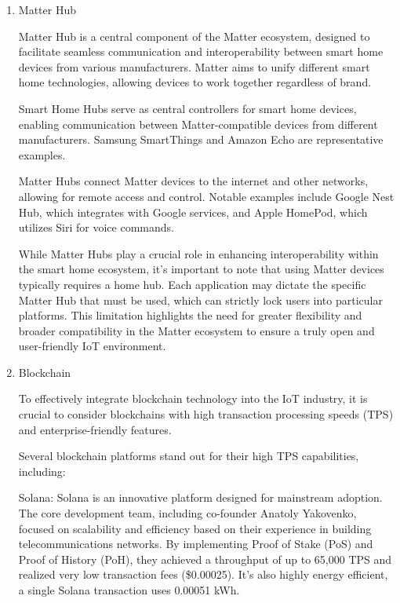 \documentclass[conference]{IEEEtran}
\begin{document}
\begin{enumerate}[itemsep=2ex, parsep=1ex]
	\item Matter Hub
	      	      
	      Matter Hub is a central component of the Matter ecosystem, designed to facilitate
	      seamless communication and interoperability between smart home devices from
	      various manufacturers. Matter aims to unify different smart home
	      technologies, allowing devices to work together regardless of brand.
	      	      
	      Smart Home Hubs serve as central controllers for smart home devices,
	      enabling communication between Matter-compatible devices from different
	      manufacturers. Samsung SmartThings and Amazon Echo are representative examples.
	      	      
	      Matter Hubs connect Matter devices to the internet and other networks,
	      allowing for remote access and control. Notable examples include Google Nest
	      Hub, which integrates with Google services, and Apple HomePod, which
	      utilizes Siri for voice commands.
	      	      
	      While Matter Hubs play a crucial role in enhancing interoperability within
	      the smart home ecosystem, it's important to note that using Matter devices
	      typically requires a home hub. Each application may dictate the specific
	      Matter Hub that must be used, which can strictly lock users into particular
	      platforms. This limitation highlights the need for greater flexibility and
	      broader compatibility in the Matter ecosystem to ensure a truly open and
	      user-friendly IoT environment.
	      	      
	\item Blockchain
	      	      
	      To effectively integrate blockchain technology into the IoT industry, it is
	      crucial to consider blockchains with high transaction processing speeds (TPS)
	      and enterprise-friendly features.
	      	      
	      Several blockchain platforms stand out for their high TPS capabilities,
	      including:
	      	      
	      Solana: Solana is an innovative platform designed for mainstream adoption.
	      The core development team, including co-founder Anatoly Yakovenko, focused
	      on scalability and efficiency based on their experience in building
	      telecommunications networks. By implementing Proof of Stake (PoS) and Proof
	      of History (PoH), they achieved a throughput of up to 65,000 TPS and
	      realized very low transaction fees (\$0.00025). It's also highly energy
	      efficient, a single Solana transaction uses 0.00051 kWh.
	      	      

\end{enumerate}
\end{document}
